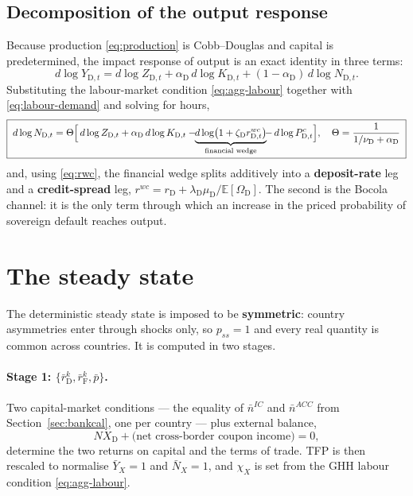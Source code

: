 \documentclass[11pt]{article}
\numberwithin{equation}{section}
\newcommand{\E}{\mathbb{E}}
\newcommand{\D}{\mathrm{D}}
\newcommand{\F}{\mathrm{F}}
\theoremstyle{definition}
\theoremstyle{plain}
\theoremstyle{remark}
\begin{document}
\subsection{Decomposition of the output response}

Because production \eqref{eq:production} is Cobb--Douglas and capital is
predetermined, the impact response of output is an exact identity in three terms:
\begin{equation}
d\log Y_{\D,t}=d\log Z_{\D,t}+\alpha_\D\,d\log K_{\D,t}+(1-\alpha_\D)\,d\log N_{\D,t}.
\label{eq:decomp-Y}
\end{equation}
Substituting the labour-market condition \eqref{eq:agg-labour} together with
\eqref{eq:labour-demand} and solving for hours,
\begin{equation}
\boxed{\;
d\log N_{\D,t}
=\Theta\Bigl[\,d\log Z_{\D,t}+\alpha_\D\,d\log K_{\D,t}
-\!\!\underbrace{d\log\bigl(1+\zeta_\D r^{wc}_{\D,t}\bigr)}_{\text{financial wedge}}
\!\!-\,d\log P^{c}_{\D,t}\Bigr],
\quad
\Theta=\frac{1}{1/\nu_\D+\alpha_\D}\;}
\label{eq:decomp-N}
\end{equation}
and, using \eqref{eq:rwc}, the financial wedge splits additively into a
\textbf{deposit-rate} leg and a \textbf{credit-spread} leg,
$r^{wc}=r_{\D}+\lambda_\D\mu_\D/\E[\Omega_\D]$. The second is the Bocola channel:
it is the only term through which an increase in the priced probability of sovereign
default reaches output.

\section{The steady state}

The deterministic steady state is imposed to be \textbf{symmetric}: country
asymmetries enter through shocks only, so $p_{ss}=1$ and every real quantity is
common across countries. It is computed in two stages.

\paragraph{\texorpdfstring{Stage 1: $\{\bar r^{k}_\D,\bar r^{k}_\F,\bar p\}$.}
                          {Stage 1.}} Two capital-market
conditions --- the equality of $\bar n^{IC}$ and $\bar n^{ACC}$ from
Section~\ref{sec:bankcal}, one per country --- plus external balance,
\begin{equation}
NX_\D+\bigl(\text{net cross-border coupon income}\bigr)=0 ,
\label{eq:ss-external}
\end{equation}
determine the two returns on capital and the terms of trade. TFP is then rescaled to
normalise $\bar Y_X=1$ and $\bar N_X=1$, and $\chi_X$ is set from the GHH labour
condition \eqref{eq:agg-labour}.
\end{document}
